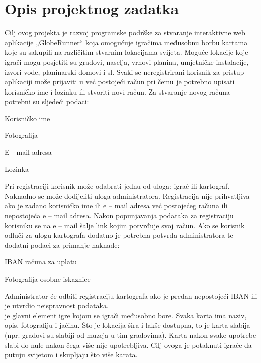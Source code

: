 \chapter{Opis projektnog zadatka}
		
		
Cilj ovog projekta je razvoj programske podrške za stvaranje interaktivne web aplikacije „GlobeRunner“  koja omogućuje igračima međusobnu borbu kartama koje su sakupili na različitim stvarnim lokacijama svijeta. Moguće lokacije koje igrači mogu posjetiti su gradovi, naselja, vrhovi planina, umjetničke instalacije, izvori vode, planinarski domovi i sl.
Svaki se neregistrirani korisnik za pristup aplikaciji može prijaviti u već postojeći račun pri čemu je potrebno upisati korisničko ime i lozinku ili stvoriti novi račun. Za stvaranje novog računa potrebni su sljedeći podaci:
		\begin{packed_item}
			\item {Korisničko ime}
			\item {Fotografija}
			\item {E - mail adresa}
			\item {Lozinka}
		\end{packed_item}
		
Pri registraciji korisnik može odabrati jednu od uloga: igrač ili kartograf. Naknadno se može dodijeliti uloga administratora. Registracija nije prihvatljiva ako je zadano korisničko ime ili e – mail adresa već postojećeg računa ili nepostojeća e – mail adresa. Nakon popunjavanja podataka za registraciju korisniku se na e – mail šalje link kojim potvrđuje svoj račun. Ako se korisnik odluči za ulogu kartografa dodatno je potrebna potvrda administratora te dodatni podaci za primanje naknade:
		\begin{packed_item}
			\item {IBAN računa za uplatu}
			\item {Fotografija osobne iskaznice}
		\end{packed_item}
	

Administrator će odbiti registraciju kartografa ako je predan nepostojeći IBAN ili je utvrdio neispravnost podataka.\\

\textit {} je glavni element igre kojom se igrači međusobno bore. Svaka karta ima naziv, opis, fotografiju i jačinu. Što je lokacija šira i lakše dostupna, to je karta slabija (npr. gradovi su slabiji od muzeja u tim gradovima). Karta nakon svake upotrebe slabi do nule nakon čega više nije upotrebljiva. Cilj ovoga je potaknuti igrače da putuju svijetom i skupljaju što više karata.\\
 
